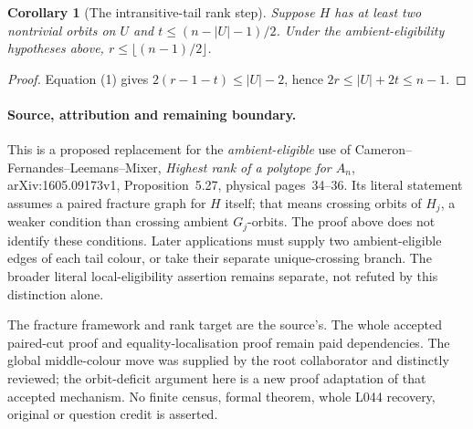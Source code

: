 \documentclass[11pt,a4paper]{article}
\newtheorem{corollary}[lemma]{Corollary}
\begin{document}
\begin{corollary}[The intransitive-tail rank step]
Suppose $H$ has at least two nontrivial orbits on $U$ and
$t\leq(n-|U|-1)/2$. Under the ambient-eligibility hypotheses
above, $r\leq\lfloor(n-1)/2\rfloor$.
\end{corollary}
\begin{proof}
Equation (1) gives $2(r-1-t)\leq |U|-2$, hence
$2r\leq |U|+2t\leq n-1$.
\end{proof}

\paragraph{Source, attribution and remaining boundary.}
This is a proposed replacement for the \emph{ambient-eligible}
use of Cameron--Fernandes--Leemans--Mixer, \emph{Highest rank
of a polytope for $A_n$}, arXiv:1605.09173v1,
Proposition~5.27, physical pages~34--36. Its literal statement
assumes a paired fracture graph for $H$ itself; that means
crossing orbits of $H_j$, a weaker condition than crossing
ambient $G_j$-orbits. The proof above does not identify these
conditions. Later applications must supply two ambient-eligible
edges of each tail colour, or take their separate unique-crossing
branch. The broader literal local-eligibility assertion remains
separate, not refuted by this distinction alone.

The fracture framework and rank target are the source's.
The whole accepted paired-cut proof and equality-localisation
proof remain paid dependencies. The global middle-colour move
was supplied by the root collaborator and distinctly reviewed;
the orbit-deficit argument here is a new proof adaptation of
that accepted mechanism. No finite census, formal theorem,
whole L044 recovery, original or question credit is asserted.
\end{document}
